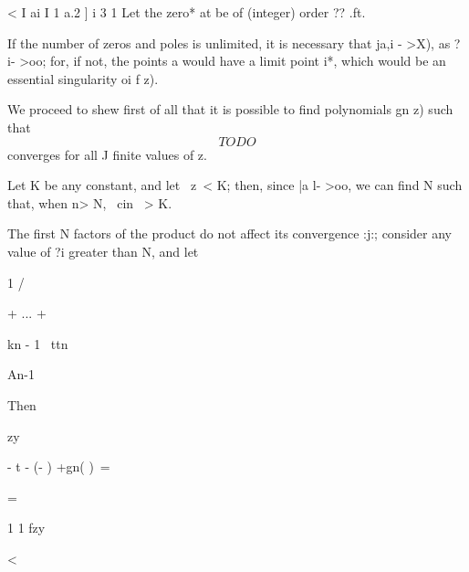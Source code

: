 < I ai I 1 a.2 ] i 3 1 Let the zero* at be of (integer) order ?? .ft.

If the number of zeros and poles is unlimited, it is necessary that
ja,i - >X), as ?i- >oo; for, if not, the points a would have a limit
point i*, which would be an essential singularity oi f z).

We proceed to shew first of all that it is possible to find
polynomials gn z) such that
$$
TODO
$$
converges for all J finite values of z.

Let K be any constant, and let \ z\ < K; then, since |a l- >oo, we can
find N such that, when n> N, \ cin \ > K.

The first N factors of the product do not affect its convergence :j:;
consider any value of ?i greater than N, and let

1 /

+ ... +

kn - 1 \ ttn

An-1

Then

zy

- t - (- ) +gn( )\ =

=

1 1 fzy

<

